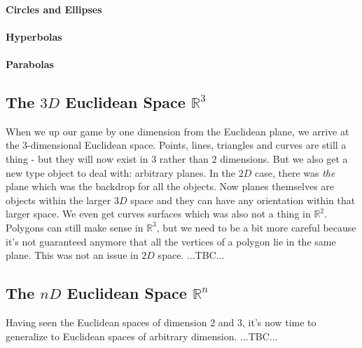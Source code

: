 \paragraph{Circles and Ellipses}

\paragraph{Hyperbolas}

\paragraph{Parabolas}






\subsection{The $3D$ Euclidean Space $\mathbb{R}^3$}
When we up our game by one dimension from the Euclidean plane, we arrive at the $3$-dimensional Euclidean space. Points, lines, triangles and curves are still a thing - but they will now exist in $3$ rather than $2$ dimensions. But we also get a new type object to deal with: arbitrary planes. In the $2D$ case, there was \emph{the} plane which was the backdrop for all the objects. Now planes themselves are objects within the larger $3D$ space and they can have any orientation within that larger space. We even get curves surfaces which was also not a thing in $\mathbb{R}^2$. Polygons can still make sense in $\mathbb{R}^3$, but we need to be a bit more careful because it's not guaranteed anymore that all the vertices of a polygon lie in the same plane. This was not an issue in $2D$ space. ...TBC...



\subsection{The $nD$ Euclidean Space $\mathbb{R}^n$}
Having seen the Euclidean spaces of dimension $2$ and $3$, it's now time to generalize to Euclidean spaces of arbitrary dimension. ...TBC...

